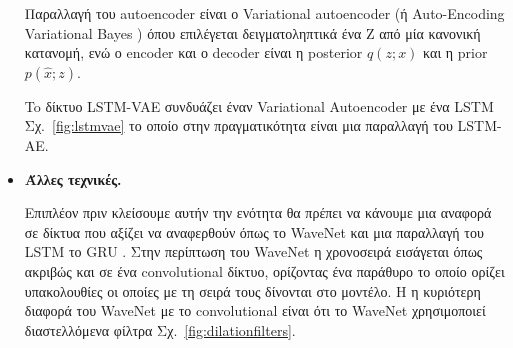 \documentclass[a4paper,12pt]{report}
\theoremstyle{definitionNODot}
\begin{document}
\begin{itemize}
		Παραλλαγή του autoencoder είναι ο Variational autoencoder (ή Auto-Encoding Variational Bayes \cite{Kingma2013WellingVAE}) όπου επιλέγεται δειγματοληπτικά ένα Z από μία κανονική κατανομή, ενώ ο encoder και ο decoder είναι η posterior $q(z;x)$ και η prior $p(\hat{x};z)$.
		
		To δίκτυο LSTM-VAE συνδυάζει έναν Variational Autoencoder με ένα LSTM Σχ.~\ref{fig:lstmvae} το οποίο στην πραγματικότητα είναι μια παραλλαγή του LSTM-AΕ.
		
		
		
		
		\item \textbf{Άλλες τεχνικές.}
		
		Επιπλέον πριν κλείσουμε αυτήν την ενότητα θα πρέπει να κάνουμε μια αναφορά σε δίκτυα που αξίζει να αναφερθούν όπως το WaveNet \cite{Oord2016WaveNet} και μια παραλλαγή του LSTM το GRU \cite{ChoMerrienboer2014GRURNN}. Στην περίπτωση του WaveNet η χρονοσειρά εισάγεται όπως ακριβώς και σε ένα convolutional δίκτυο, ορίζοντας ένα παράθυρο το οποίο ορίζει υπακολουθίες οι οποίες με τη σειρά τους δίνονται στο μοντέλο. Η η κυριότερη διαφορά του WaveNet με το convolutional είναι ότι το WaveNet χρησιμοποιεί διαστελλόμενα φίλτρα Σχ.~\ref{fig:dilationfilters}. 
		

\end{itemize}
\end{document}
